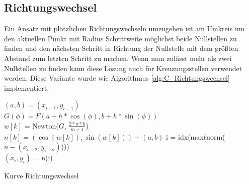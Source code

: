 \documentclass[a4paper,11pt,bibliography=totoc,listof=totoc,headinclude=true,cleardoublepage=empty,oneside]{scrartcl}
\newcounter{satz}
\begin{document}
\subsection{Richtungswechsel}
Ein Ansatz mit plötzlichen Richtungswechseln umzugehen ist am Umkreis um den aktuellen Punkt mit Radius Schrittweite möglichst beide Nullstellen zu finden und den nächsten Schritt in Richtung der Nullstelle mit dem größten Abstand zum letzten Schritt zu machen. Wenn man zulässt mehr als zwei Nullstellen zu finden kann diese Lösung auch für Kreuzungsstellen verwendet werden. Diese Variante wurde wie Algorithmus \ref{alg:C_Richtungswechsel} implementiert.
\begin{algorithm}[h]
	\label{alg:C_Richtungswechsel}
	$(a,b) = (x_{i-1},y_{i-1})$\\
	$G(\phi) = F(a+h*\cos(\phi),b+h*\sin(\phi))$ \\
	{
		$w\left[ k \right]$ = Newton($G$, $\frac{2*\pi*k}{m+1}$)\\
		$n\left[k\right] = \left(\cos(w\left[k\right]),\sin(w\left[k\right])\right)+(a,b) $
	}
	i = idx(max(norm($n-(x_{i-2},y_{i-2})$)))\\
	$(x_i,y_i)$ = n(i)
	\caption{Kurve Richtungswechsel}
\end{algorithm}
\end{document}

